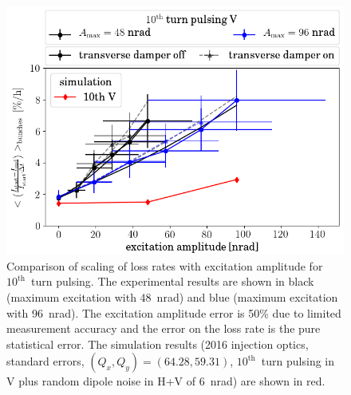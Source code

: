 \documentclass[%
 reprint,
 amsmath,amssymb,
 aps,
prstab,
]{revtex4-1}
\begin{document}
\begin{figure}[h]
		\centering
		\includegraphics[width=1.0\linewidth]{2016_scale_amp_10v_ran_lbllong_sim.png}
	\caption{\label{fig:10thexploss} Comparison of scaling of loss rates with excitation amplitude for $10^{\mathrm{th}}$~turn pulsing. The experimental results are shown in black (maximum excitation with 48~nrad) and blue (maximum excitation with 96~nrad). The excitation amplitude error is 50\% due to limited measurement accuracy and the error on the loss rate is the pure statistical error. The simulation results (2016 injection optics, standard errors, $(Q_x,Q_y)=(64.28,59.31)$, $10^{\mathrm{th}}$~turn pulsing in V plus random dipole noise in H+V of 6~nrad) are shown in red.}
\end{figure}
\end{document}
